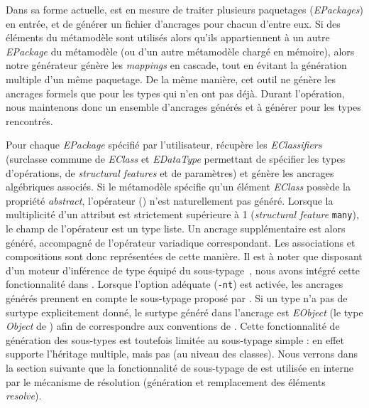 Dans sa forme actuelle, {\tomemf} est en mesure de traiter plusieurs paquetages
{\ecore} (\emph{EPackages}) en entrée, et de générer un fichier d'ancrages pour
chacun d'entre eux. Si des éléments du métamodèle sont utilisés alors qu'ils
appartiennent à un autre \emph{EPackage} du métamodèle (ou d'un autre
métamodèle chargé en mémoire), alors notre générateur génère les
\emph{mappings} en cascade, tout en évitant la génération multiple d'un même
paquetage. De la même manière, cet outil ne génère les ancrages formels que
pour les types qui n'en ont pas déjà. Durant l'opération, nous maintenons donc
un ensemble d'ancrages générés et à générer pour les types rencontrés.

Pour chaque \emph{EPackage} spécifié par l'utilisateur, {\tomemf} récupère les
\emph{EClassifiers} (surclasse commune de \emph{EClass} et \emph{EDataType}
permettant de spécifier les types d'opérations, de \emph{structural features}
et de paramètres) et génère les ancrages algébriques associés.
Si le métamodèle spécifie qu'un élément
\emph{EClass} possède la propriété \emph{abstract}, l'opérateur ()
n'est naturellement pas généré. Lorsque la multiplicité d'un attribut est
strictement supérieure à 1 (\emph{structural feature} \texttt{many}), le champ
de l'opérateur est un type liste. Un ancrage supplémentaire est alors généré,
accompagné de l'opérateur variadique correspondant. Les associations et
compositions sont donc représentées de cette manière. Il est à noter que {\tom}
disposant d'un moteur d'inférence de type équipé du
sous-typage~\cite{tavares09}, nous avons intégré cette fonctionnalité dans
{\tomemf}. Lorsque l'option adéquate (\texttt{-nt}) est activée, les ancrages
générés prennent en compte le sous-typage proposé par {\ecore}. Si un type n'a
pas de surtype explicitement donné, le surtype généré dans l'ancrage est
\emph{EObject} (le type \emph{Object} de {\ecore}) afin de correspondre aux
conventions de {\emf}.  Cette fonctionnalité de génération des sous-types est
toutefois limitée au sous-typage simple : en effet {\ecore} supporte l'héritage
multiple, mais pas {\java} (au niveau des classes). Nous verrons dans la
section suivante que la fonctionnalité de sous-typage de {\tom} est utilisée en
interne par le mécanisme de résolution (génération et remplacement des éléments
\emph{resolve}).

